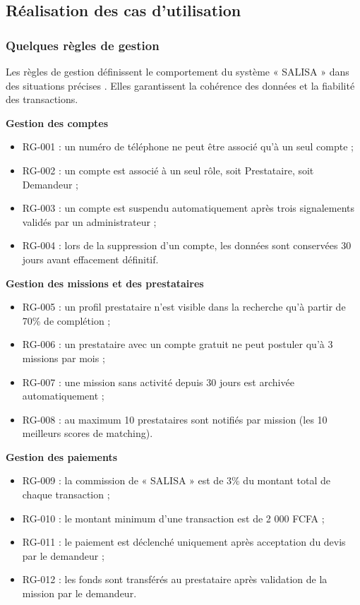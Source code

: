 \subsection{Réalisation des cas d'utilisation}

\subsubsection{Quelques règles de gestion}

Les règles de gestion définissent le comportement du système « SALISA » dans des situations précises \cite{roques_uml}. Elles garantissent la cohérence des données et la fiabilité des transactions.

\vspace{0.2cm}
\noindent\textbf{\textcolor{vertCongo}{Gestion des comptes}}

\begin{itemize}
	\item RG-001 : un numéro de téléphone ne peut être associé qu'à un seul compte ;
	\item RG-002 : un compte est associé à un seul rôle, soit Prestataire, soit Demandeur ;
	\item RG-003 : un compte est suspendu automatiquement après trois signalements validés par un administrateur ;
	\item RG-004 : lors de la suppression d'un compte, les données sont conservées 30 jours avant effacement définitif.
\end{itemize}

\noindent\textbf{\textcolor{vertCongo}{Gestion des missions et des prestataires}}

\begin{itemize}
	\item RG-005 : un profil prestataire n'est visible dans la recherche qu'à partir de 70\% de complétion ;
	\item RG-006 : un prestataire avec un compte gratuit ne peut postuler qu'à 3 missions par mois ;
	\item RG-007 : une mission sans activité depuis 30 jours est archivée automatiquement ;
	\item RG-008 : au maximum 10 prestataires sont notifiés par mission (les 10 meilleurs scores de matching).
\end{itemize}

\noindent\textbf{\textcolor{vertCongo}{Gestion des paiements}}

\begin{itemize}
	\item RG-009 : la commission de « SALISA » est de 3\% du montant total de chaque transaction ;
	\item RG-010 : le montant minimum d'une transaction est de 2 000 FCFA ;
	\item RG-011 : le paiement est déclenché uniquement après acceptation du devis par le demandeur ;
	\item RG-012 : les fonds sont transférés au prestataire après validation de la mission par le demandeur.
\end{itemize}

